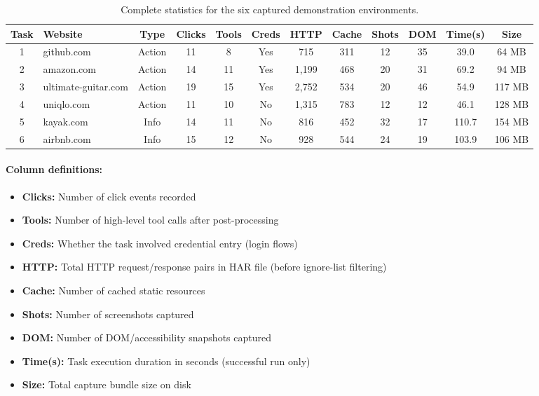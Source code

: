 \documentclass[letterpaper]{article}
\begin{document}
\begin{table}[t]
\caption{Complete statistics for the six captured demonstration environments.}
\label{tab:stats}
\vskip 0.1in
\centering
\small
\begin{tabular}{@{}clcccccccccc@{}}
\toprule
\textbf{Task} & \textbf{Website} & \textbf{Type} & \textbf{Clicks} & \textbf{Tools} & \textbf{Creds} & \textbf{HTTP} & \textbf{Cache} & \textbf{Shots} & \textbf{DOM} & \textbf{Time(s)} & \textbf{Size} \\
\midrule
1 & github.com & Action & 11 & 8 & Yes & 715 & 311 & 12 & 35 & 39.0 & 64 MB \\
2 & amazon.com & Action & 14 & 11 & Yes & 1,199 & 468 & 20 & 31 & 69.2 & 94 MB \\
3 & ultimate-guitar.com & Action & 19 & 15 & Yes & 2,752 & 534 & 20 & 46 & 54.9 & 117 MB \\
4 & uniqlo.com & Action & 11 & 10 & No & 1,315 & 783 & 12 & 12 & 46.1 & 128 MB \\
5 & kayak.com & Info & 14 & 11 & No & 816 & 452 & 32 & 17 & 110.7 & 154 MB \\
6 & airbnb.com & Info & 15 & 12 & No & 928 & 544 & 24 & 19 & 103.9 & 106 MB \\
\bottomrule
\end{tabular}
\end{table}

\paragraph{Column definitions:}
\begin{itemize}
    \item \textbf{Clicks:} Number of click events recorded
    \item \textbf{Tools:} Number of high-level tool calls after post-processing
    \item \textbf{Creds:} Whether the task involved credential entry (login flows)
    \item \textbf{HTTP:} Total HTTP request/response pairs in HAR file (before ignore-list filtering)
    \item \textbf{Cache:} Number of cached static resources
    \item \textbf{Shots:} Number of screenshots captured
    \item \textbf{DOM:} Number of DOM/accessibility snapshots captured
    \item \textbf{Time(s):} Task execution duration in seconds (successful run only)
    \item \textbf{Size:} Total capture bundle size on disk
\end{itemize}
\end{document}
